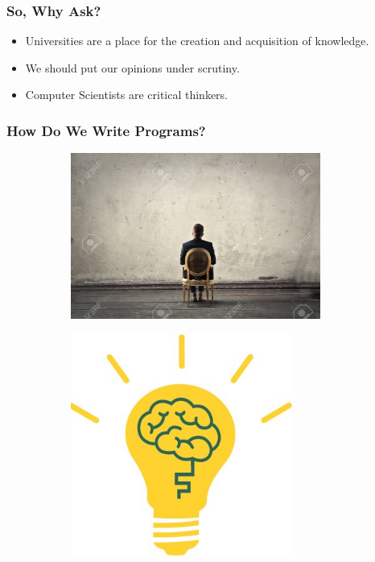 \documentclass{beamer}
\begin{document}
\begin{frame}
  \frametitle{So, Why Ask?}
  \begin{itemize}
  \item<1-> Universities are a place for the creation and acquisition of knowledge.
  \item<2-> We should put our opinions under scrutiny.
  \item<3-> Computer Scientists are critical thinkers.
  \end{itemize}
\end{frame}

\begin{frame}
  \frametitle{How Do We Write Programs?}
  \begin{figure}
    \begin{subfigure}[b]{0.4\textwidth}
      \includegraphics[width=0.9\textwidth]{images/staring-at-a-blank-wall.jpg}
    \end{subfigure}
    \pause
    \begin{subfigure}[b]{0.4\textwidth}
      \includegraphics[width=0.8\textwidth]{images/eureka.jpg}
    \end{subfigure}
  \end{figure}
\end{frame}
\end{document}
